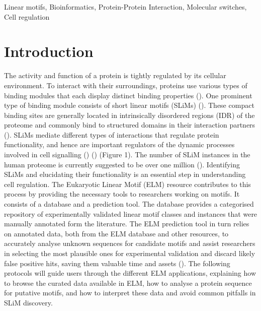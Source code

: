 Linear motifs, Bioinformatics, Protein-Protein Interaction, Molecular
switches, Cell regulation

\section{Introduction}\label{introduction}

The activity and function of a protein is tightly regulated by its
cellular environment. To interact with their surroundings, proteins use
various types of binding modules that each display distinct binding
properties (\cite{10550212}). One prominent type of binding module
consists of short linear motifs (SLiMs) (\cite{18508681}). These compact
binding sites are generally located in intrinsically disordered regions
(IDR) of the proteome and commonly bind to structured domains in their
interaction partners (\cite{21909575}). SLiMs mediate different types of
interactions that regulate protein functionality, and hence are
important regulators of the dynamic processes involved in cell
signalling (\cite{22480932}) (\cite{24926813}) (Figure 1). The number of
SLiM instances in the human proteome is currently suggested to be over
one million (\cite{25038412}). Identifying SLiMs and elucidating their
functionality is an essential step in understanding cell regulation. The
Eukaryotic Linear Motif (ELM) resource contributes to this process by
providing the necessary tools to researchers working on motifs. It
consists of a database and a prediction tool. The database provides a
categorised repository of experimentally validated linear motif classes
and instances that were manually annotated form the literature. The ELM
prediction tool in turn relies on annotated data, both from the ELM
database and other resources, to accurately analyse unknown sequences
for candidate motifs and assist researchers in selecting the most
plausible ones for experimental validation and discard likely false
positive hits, saving them valuable time and assets (\cite{22110040}).
The following protocols will guide users through the different ELM
applications, explaining how to browse the curated data available in
ELM, how to analyse a protein sequence for putative motifs, and how to
interpret these data and avoid common pitfalls in SLiM discovery.

